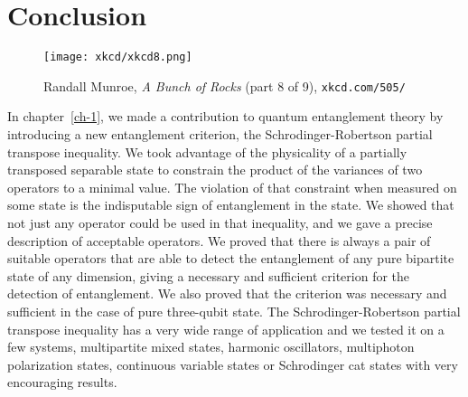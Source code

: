 \chapter*{Conclusion}

\begin{figure}[h]
\captionsetup{labelformat=empty}
 \texttt{[image: xkcd/xkcd8.png]}
\caption*{  Randall Munroe, \emph{A Bunch of Rocks} (part 8 of 9), \texttt{xkcd.com/505/} }
\end{figure}


In chapter~\ref{ch-1}, we made a contribution to quantum entanglement theory by introducing a new entanglement criterion, the Schrodinger-Robertson partial transpose inequality. We took advantage of the physicality of a partially transposed separable state to constrain the product of the variances of two operators to a minimal value. The violation of that constraint when measured on some state is the indisputable sign of entanglement in the state. We showed that not just any operator could be used in that inequality, and we gave a precise description of acceptable operators. We proved that there is always a pair of suitable operators that are able to detect the entanglement of any pure bipartite state of any dimension, giving a necessary and sufficient criterion for the detection of entanglement. We also proved that the criterion was necessary and sufficient in the case of pure three-qubit state. The Schrodinger-Robertson partial transpose inequality has a very wide range of application and we tested it on a few systems, multipartite mixed states, harmonic oscillators, multiphoton polarization states, continuous variable states or Schrodinger cat states with very encouraging results. 

